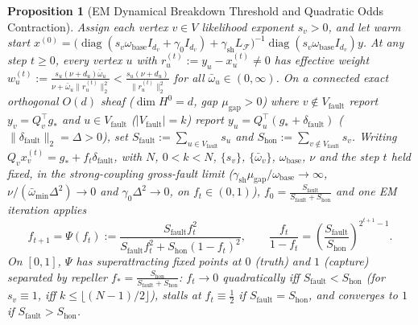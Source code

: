 \documentclass[11pt,a4paper]{article}
\newtheorem{proposition}{Proposition}
\theoremstyle{definition}
\theoremstyle{remark}
\newcommand{\diag}{\operatorname{diag}}
\begin{document}
\begin{proposition}[EM Dynamical Breakdown Threshold and Quadratic Odds Contraction]
\label{prop:warm_start}
Assign each vertex $v \in V$ likelihood exponent $s_v > 0$, and let warm start $x^{(0)} = \bigl(\diag(s_v\omega_{\mathrm{base}} I_{d_v} + \gamma_0 I_{d_v}) + \gamma_{\mathrm{sh}} L_{\mathcal{F}}\bigr)^{-1} \diag(s_v\omega_{\mathrm{base}} I_{d_v}) y$. At any step $t \ge 0$, every vertex $u$ with $r_u^{(t)} := y_u - x_u^{(t)} \ne 0$ has effective weight $w_u^{(t)} := \frac{s_u(\nu + d_u)\bar{\omega}_u}{\nu + \bar{\omega}_u \|r_u^{(t)}\|_2^2} < \frac{s_u(\nu + d_u)}{\|r_u^{(t)}\|_2^2}$ for all $\bar{\omega}_u \in (0, \infty)$. On a connected exact orthogonal $O(d)$ sheaf ($\dim H^0 = d$, gap $\mu_{\mathrm{gap}} > 0$) where $v \notin V_{\mathrm{fault}}$ report $y_v = Q_v^\top g_*$ and $u \in V_{\mathrm{fault}}$ ($|V_{\mathrm{fault}}| = k$) report $y_u = Q_u^\top(g_* + \delta_{\mathrm{fault}})$ ($\|\delta_{\mathrm{fault}}\|_2 = \Delta > 0$), set $S_{\mathrm{fault}} := \sum_{u \in V_{\mathrm{fault}}} s_u$ and $S_{\mathrm{hon}} := \sum_{v \notin V_{\mathrm{fault}}} s_v$. Writing $Q_v x_v^{(t)} = g_* + f_t \delta_{\mathrm{fault}}$, with $N$, $0 < k < N$, $\{s_v\}$, $\{\bar{\omega}_v\}$, $\omega_{\mathrm{base}}$, $\nu$ and the step $t$ held fixed, in the strong-coupling gross-fault limit ($\gamma_{\mathrm{sh}}\mu_{\mathrm{gap}}/\omega_{\mathrm{base}} \to \infty$, $\nu / (\bar{\omega}_{\min}\Delta^2) \to 0$ and $\gamma_0\Delta^2 \to 0$, on $f_t \in (0,1)$), $f_0 = \frac{S_{\mathrm{fault}}}{S_{\mathrm{fault}} + S_{\mathrm{hon}}}$ and one EM iteration applies
\begin{equation}
  f_{t+1} = \Psi(f_t) := \frac{S_{\mathrm{fault}} f_t^2}{S_{\mathrm{fault}} f_t^2 + S_{\mathrm{hon}} (1 - f_t)^2},
  \qquad \frac{f_t}{1 - f_t} = \left(\frac{S_{\mathrm{fault}}}{S_{\mathrm{hon}}}\right)^{2^{t+1} - 1}.
  \label{eq:em_dynamics}
\end{equation}
On $[0, 1]$, $\Psi$ has superattracting fixed points at $0$ (truth) and $1$ (capture) separated by repeller $f_* = \frac{S_{\mathrm{hon}}}{S_{\mathrm{fault}} + S_{\mathrm{hon}}}$: $f_t \to 0$ quadratically iff $S_{\mathrm{fault}} < S_{\mathrm{hon}}$ (for $s_v \equiv 1$, iff $k \le \lfloor(N-1)/2\rfloor$), stalls at $f_t \equiv \tfrac{1}{2}$ if $S_{\mathrm{fault}} = S_{\mathrm{hon}}$, and converges to $1$ if $S_{\mathrm{fault}} > S_{\mathrm{hon}}$.
\end{proposition}
\end{document}
